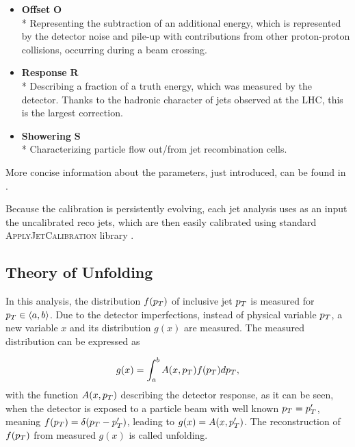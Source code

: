 \begin{itemize}
  \item \textbf{Offset} $\mathbf{O}$
  \\*
    Representing the subtraction of an additional energy, which is represented by the
    detector noise and pile-up with contributions from other proton-proton
    collisions, occurring during a beam crossing.

  \item \textbf{Response} $\mathbf{R}$
  \\*
    Describing a fraction of a truth energy, which was measured by the
    detector. Thanks to the hadronic character of jets observed at the LHC, this
    is the largest correction.

  \item \textbf{Showering} $\mathbf{S}$
  \\*
    Characterizing particle flow out/from jet recombination cells.

\end{itemize}

More concise information about the parameters, just introduced, can be found in
\cite{ZdenekThesis}.

Because the calibration is persistently evolving, each jet analysis uses as an
input the uncalibrated reco jets, which are then easily calibrated using
standard \textsc{ApplyJetCalibration} library \cite{ApplyJetCalibration}.

\subsection{Theory of Unfolding}

In this analysis, the distribution $f(p_{T})$ of inclusive jet $p_{T}$ is measured
for $p_{T} \in \langle a, b \rangle$. Due to the detector imperfections,
instead of physical variable $p_{T}$, a new variable $x$ and its distribution
$g(x)$ are measured. The measured distribution can be expressed as

\begin{equation}
  g(x) = \int_a^b A(x, p_{T}) f(p_{T}) dp_{T},
  \label{eq:UnfoldingBasicDefinition}
\end{equation}
with the function $A(x, p_{T})$ describing the detector response, as it can be
seen, when the detector is exposed to a particle beam with well known $p_{T} =
p_{T}'$, meaning $f(p_{T}) = \delta(p_{T} - p_{T}')$, leading to $g(x) = A(x, p_{T}')$. The
reconstruction of $f(p_{T})$ from measured $g(x)$ is called unfolding.

